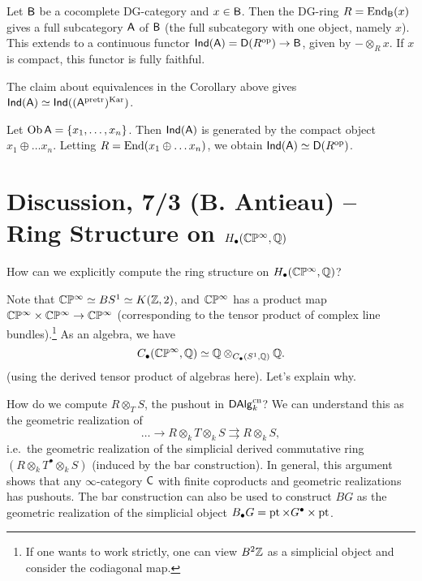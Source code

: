 \documentclass{amsart}
\begin{document}
\begin{ex}
	Let $\mathsf{B}$ be a cocomplete DG-category and $x \in \mathsf{B}$.
	Then the DG-ring $R = \operatorname{End}_{\mathsf{B}}(x)$ gives a full subcategory $\mathsf{A}$ of $\mathsf{B}$ (the full subcategory with one object, namely $x$).
	This extends to a continuous functor $\mathsf{Ind}(\mathsf{A}) = \mathsf{D}(R^{\mathrm{op}}) \to \mathsf{B}$, given by $- \otimes_R x$.
	If $x$ is compact, this functor is fully faithful.
\end{ex}

\begin{ex}
	The claim about equivalences in the Corollary above gives $\mathsf{Ind}(\mathsf{A}) \simeq \mathsf{Ind}((\mathsf{A}^{\mathrm{pretr}})^{\mathrm{Kar}})$.
\end{ex}

\begin{ex}
	Let $\operatorname{Ob} \mathsf{A} = \{ x_1, \dots, x_n \}$.
	Then $\mathsf{Ind}(\mathsf{A})$ is generated by the compact object $x_1 \oplus \dots x_n$.
	Letting $R = \operatorname{End}(x_1 \oplus \dots x_n)$, we obtain $\mathsf{Ind}(\mathsf{A}) \simeq \mathsf{D}(R^{\mathrm{op}})$.
\end{ex}

\section*{Discussion, 7/3 (B. Antieau) -- Ring Structure on $H_\bullet(\mathbb{C}\mathbb{P}^\infty, \mathbb{Q})$}

How can we explicitly compute the ring structure on $H_\bullet(\mathbb{C}\mathbb{P}^\infty, \mathbb{Q})$?

Note that $\mathbb{C}\mathbb{P}^\infty \simeq BS^1 \simeq K(\mathbb{Z}, 2)$, and $\mathbb{C}\mathbb{P}^\infty$ has a product map $\mathbb{C}\mathbb{P}^\infty \times \mathbb{C}\mathbb{P}^\infty \to \mathbb{C}\mathbb{P}^\infty$ (corresponding to the tensor product of complex line bundles).\footnote{If one wants to work strictly, one can view $B^2 \mathbb{Z}$ as a simplicial object and consider the codiagonal map.}
As an algebra, we have 
\[
	C_\bullet(\mathbb{C}\mathbb{P}^\infty, \mathbb{Q}) \simeq \mathbb{Q} \otimes_{C_\bullet(S^1, \mathbb{Q})} \mathbb{Q}.
\]
(using the derived tensor product of algebras here).
Let's explain why.

How do we compute $R \otimes_T S$, the pushout in $\mathsf{DAlg}_k^{\mathrm{cn}}$?
We can understand this as the geometric realization of
\[
	\dots \to R \otimes_k T \otimes_k S \rightrightarrows R \otimes_k S,
\]
i.e.\ the geometric realization of the simplicial derived commutative ring $(R \otimes_k T^\bullet \otimes_k S)$ (induced by the bar construction).
In general, this argument shows that any $\infty$-category $\mathsf{C}$ with finite coproducts and geometric realizations has pushouts.
The bar construction can also be used to construct $BG$ as the geometric realization of the simplicial object $B_\bullet G = \operatorname{pt} \times G^\bullet \times \operatorname{pt}$.
\end{document}
